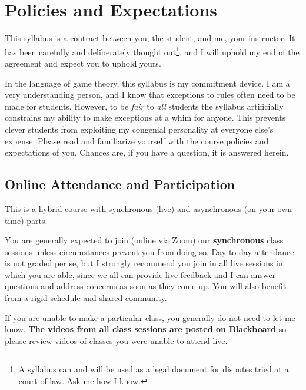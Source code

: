 \documentclass{article}
\begin{document}
\hypertarget{policies-and-expectations}{%
\section*{Policies and Expectations}\label{policies-and-expectations}}

This syllabus is a contract between you, the student, and me, your
instructor. It has been carefully and deliberately thought out\footnote{A
  syllabus can and will be used as a legal document for disputes tried
  at a court of law. Ask me how I know.}, and I will uphold my end of
the agreement and expect you to uphold yours.

In the language of game theory, this syllabus is my commitment device. I
am a very understanding person, and I know that exceptions to rules
often need to be made for students. However, to be \emph{fair} to
\emph{all} students the syllabus artificially constrains my ability to
make exceptions at a whim for anyone. This prevents clever students from
exploiting my congenial personality at everyone else's expense. Please
read and familiarize yourself with the course policies and expectations
of you. Chances are, if you have a question, it is answered herein.

\hypertarget{online-attendance-and-participation}{%
\subsection*{Online Attendance and
Participation}\label{online-attendance-and-participation}}

This is a hybrid course with synchronous (live) and asynchronous (on
your own time) parts.

You are generally expected to join (online via Zoom) our
\textbf{synchronous} class sessions unless circumstances prevent you
from doing so. Day-to-day attendance is not graded per se, but I
strongly recommend you join in all live sessions in which you are able,
since we all can provide live feedback and I can answer questions and
address concerns as soon as they come up. You will also benefit from a
rigid schedule and shared community.

If you are unable to make a particular class, you generally do not need
to let me know. \textbf{The videos from all class sessions are posted on
Blackboard} so please review videos of classes you were unable to attend
live.
\end{document}
